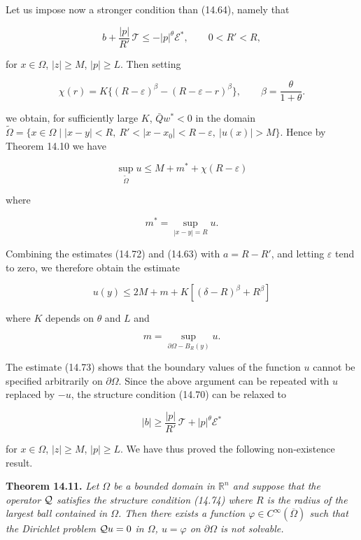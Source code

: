 Let us impose now a stronger condition than (14.64), namely that

\begin{equation}
b+\frac{|p|}{R'}\,\mathcal{T}\leq -|p|^{\theta}\mathcal{E}^{*}, \qquad 0<R'<R,
\tag{14.70}
\end{equation}

for $x\in\Omega$, $|z|\geq M$, $|p|\geq L$. Then setting

\begin{equation}
\chi(r)=K\{(R-\varepsilon)^{\beta}-(R-\varepsilon-r)^{\beta}\}, \qquad \beta=\frac{\theta}{1+\theta}.
\tag{14.71}
\end{equation}

we obtain, for sufficiently large $K$, $\bar{Q}w^{*}<0$ in the domain $\tilde{\Omega}=\{x\in\Omega \mid |x-y|<R,\ R'<|x-x_{0}|<R-\varepsilon,\ |u(x)|>M\}$. Hence by Theorem 14.10 we have

\begin{equation}
\sup_{\tilde{\Omega}} u\leq M+m^{*}+\chi(R-\varepsilon)
\tag{14.72}
\end{equation}

where

\[
m^{*}=\sup_{|x-y|=R} u.
\]

Combining the estimates (14.72) and (14.63) with $a=R-R'$, and letting $\varepsilon$ tend to zero, we therefore obtain the estimate

\begin{equation}
u(y)\leq 2M+m+K[(\delta-R)^{\beta}+R^{\beta}]
\tag{14.73}
\end{equation}

where $K$ depends on $\theta$ and $L$ and

\[
m=\sup_{\partial\Omega - B_{R}(y)} u.
\]

The estimate (14.73) shows that the boundary values of the function $u$ cannot be specified arbitrarily on $\partial\Omega$. Since the above argument can be repeated with $u$ replaced by $-u$, the structure condition (14.70) can be relaxed to

\begin{equation}
|b|\geq \frac{|p|}{R'}\,\mathcal{T}+|p|^{\theta}\mathcal{E}^{*}
\tag{14.74}
\end{equation}


for $x\in \Omega$, $|z|\ge M$, $|p|\ge L$. We have thus proved the following non-existence
result.

\begin{theorem}\label{gt14-boundary-gradient-14-11}
\textbf{Theorem 14.11.} \textit{Let $\Omega$ be a bounded domain in $\mathbb{R}^n$ and suppose that the operator $\mathcal{Q}$
satisfies the structure condition (14.74) where $R$ is the radius of the largest ball
contained in $\Omega$. Then there exists a function $\varphi\in C^{\infty}(\overline{\Omega})$ such that the Dirichlet
problem $\mathcal{Q} u=0$ in $\Omega$, $u=\varphi$ on $\partial\Omega$ is not solvable.}
\end{theorem}

